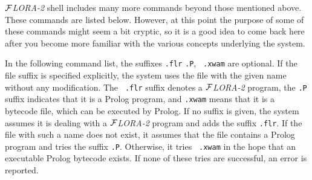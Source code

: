 \documentclass[11pt]{article}
\newcommand{\FLORA}{{\mbox{${\cal F}${\small\it LORA}\rm\emph{-2}}}\xspace}
\newcommand{\ofile}{xwam}
\begin{document}
\FLORA shell includes many more commands beyond those mentioned above.
These commands are listed below. However, at this point the purpose of some
of these commands might seem a bit cryptic, so it is a good idea to come
back here after you become more familiar with the various concepts
underlying the system.

In the following command list, the suffixes {\tt .flr} {\tt .P}, {\tt
  .\ofile} are optional. If the file suffix is specified explicitly, the
system uses the file with the given name without any modification. The {\tt
  .flr} suffix denotes a \FLORA program, the {\tt .P} suffix indicates that
it is a Prolog program, and {\tt .\ofile} means that it is a bytecode file,
which can be executed by Prolog.  If no suffix is given, the system assumes it
is dealing with a \FLORA program and adds the suffix {\tt .flr}. If the
file with such a name does not exist, it assumes that the file contains a
Prolog program and tries the suffix {\tt .P}. Otherwise, it tries {\tt
  .\ofile} in the hope that an executable Prolog bytecode exists. If none of
these tries are successful, an error is reported.
%
\end{document}
